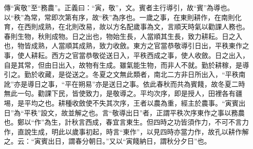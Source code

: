 {\noindent\zhuan{}\fzbyks 傳“寅敬”至“務農”。正義曰：“寅，敬”，文。賓者主行導引，故“賓”為導也。以“秩”為常，常即次第有序，故“秩”為序也。一歲之事，在東則耕作，在南則化育，在西則成熟，在北則改易，故以方名配歲事為文，言順天時氣以勸課人務也。春則生物，秋則成物。日之出也，物始生長，人當順其生長，致力耕耘。日之入也，物皆成熟，人當順其成熟，致力收斂。東方之官當恭敬導引日出，平秩東作之事，使人耕耘。西方之官當恭敬從送日入，平秩西成之事，使人收斂。日之出入，自是其常，但由日出入，故物有生成。雖氣能生物，而非人不就。勤於耕稼，是導引之。勤於收藏，是從送之。冬夏之文無此類者，南北二方非日所出入，“平秩南訛”亦是導日之事，“平在朔易”亦是送日之事。依此春秋而共為賓餞，故冬夏二時無此一句。勸課下民，皆使致力，是敬導之。平均次序，即是授人，田裡各有疆埸，是平均之也。耕種收斂使不失其次序，王者以農為重，經主於農事。“寅賓出日”為“平秩”設文，故並解之也。言“敬導出日”者，正謂平秩次序東作之事以務農也。鄭以“作”為生，計秋言西成，春宜言東生。但四時之功皆須作力，不可不言力作，直說生成，明此以歲事初起，時言“東作”，以見四時亦當力作，故孔以耕作解之。云：“寅賓出日，謂春分朝日。”又以“寅餞納日，謂秋分夕日”也。 \par}

